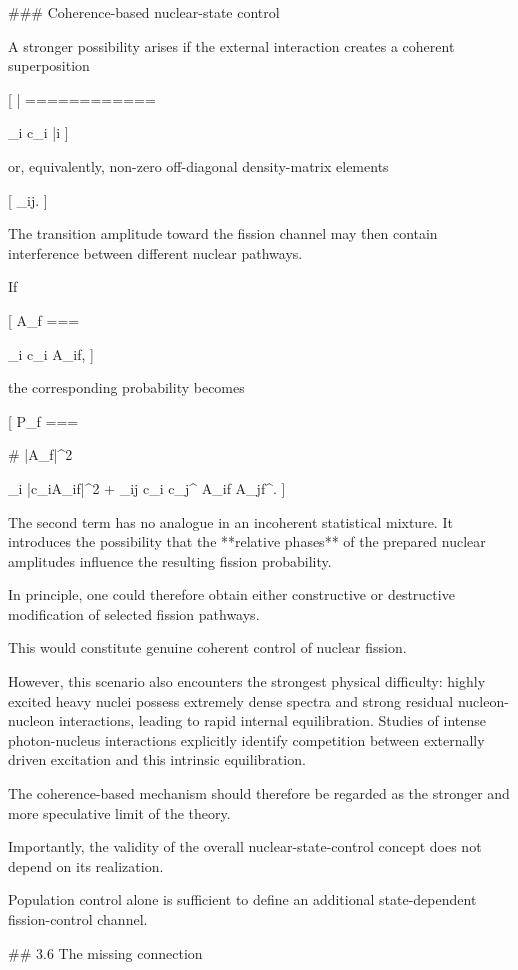 ### Coherence-based nuclear-state control

A stronger possibility arises if the external interaction creates a coherent superposition

[
|\Psi\rangle
============

\sum_i c_i |i\rangle
]

or, equivalently, non-zero off-diagonal density-matrix elements

[
\rho_{ij}.
]

The transition amplitude toward the fission channel may then contain interference between different nuclear pathways.

If

[
A_f
===

\sum_i c_i A_{i\rightarrow f},
]

the corresponding probability becomes

[
P_f
===

# |A_f|^2

\sum_i |c_iA_{i\rightarrow f}|^2
+
\sum_{i\neq j}
c_i c_j^\ast
A_{i\rightarrow f}
A_{j\rightarrow f}^\ast .
]

The second term has no analogue in an incoherent statistical mixture. It introduces the possibility that the **relative phases** of the prepared nuclear amplitudes influence the resulting fission probability.

In principle, one could therefore obtain either constructive or destructive modification of selected fission pathways.

This would constitute genuine coherent control of nuclear fission.

However, this scenario also encounters the strongest physical difficulty: highly excited heavy nuclei possess extremely dense spectra and strong residual nucleon-nucleon interactions, leading to rapid internal equilibration. Studies of intense photon-nucleus interactions explicitly identify competition between externally driven excitation and this intrinsic equilibration.

The coherence-based mechanism should therefore be regarded as the stronger and more speculative limit of the theory.

Importantly, the validity of the overall nuclear-state-control concept does not depend on its realization.

Population control alone is sufficient to define an additional state-dependent fission-control channel.

## 3.6 The missing connection

